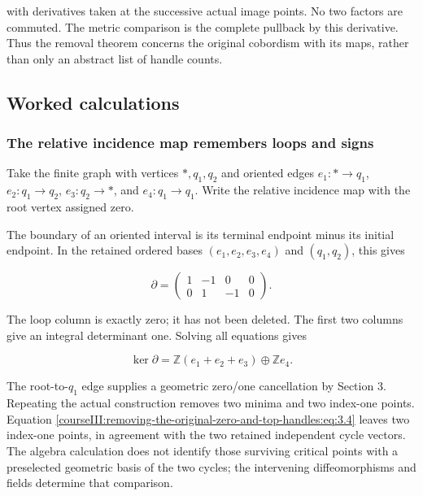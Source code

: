 with derivatives taken at the successive actual image points. No two factors are commuted. The metric comparison is the complete pullback by this derivative. Thus the removal theorem concerns the original cobordism with its maps, rather than only an abstract list of handle counts.

\subsection{Worked calculations}
\label{courseIII:removing-the-original-zero-and-top-handles:zero-exercises}

\label{courseIII:removing-the-original-zero-and-top-handles:section-6}

\subsubsection{The relative incidence map remembers loops and signs}
\label{courseIII:removing-the-original-zero-and-top-handles:section-6.1}

\label{courseIII:zero-top:6.1}

Take the finite graph with vertices \(*,q_1,q_2\) and oriented edges
\(e_1:* \to q_1\), \(e_2:q_1\to q_2\),
\(e_3:q_2\to *\), and \(e_4:q_1\to q_1\).
Write the relative incidence map with the root vertex assigned zero.

The boundary of an oriented interval is its terminal endpoint minus its initial endpoint. In the retained ordered bases \((e_1,e_2,e_3,e_4)\) and \((q_1,q_2)\), this gives

\begin{equation}
\partial=
 \begin{pmatrix}
 1&-1&0&0\\
 0&1&-1&0
 \end{pmatrix}.
 \label{courseIII:removing-the-original-zero-and-top-handles:eq:6.1}
\end{equation}

The loop column is exactly zero; it has not been deleted. The first two columns give an integral determinant one. Solving all equations gives

\begin{equation}
\ker\partial
 =\mathbb Z(e_1+e_2+e_3)\oplus\mathbb Z e_4.
 \label{courseIII:removing-the-original-zero-and-top-handles:eq:6.2}
\end{equation}

The root-to-\(q_1\) edge supplies a geometric zero/one cancellation by Section 3. Repeating the actual construction removes two minima and two index-one points. Equation \eqref{courseIII:removing-the-original-zero-and-top-handles:eq:3.4} leaves two index-one points, in agreement with the two retained independent cycle vectors. The algebra calculation does not identify those surviving critical points with a preselected geometric basis of the two cycles; the intervening diffeomorphisms and fields determine that comparison.

